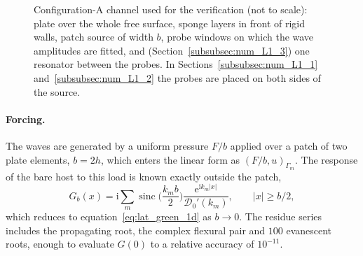 {\begin{figure}[t]
    \centering
    \caption{Configuration-A channel used for the verification (not to scale): plate over the whole free surface, sponge layers in front of rigid walls, patch source of width $b$, probe windows on which the wave amplitudes are fitted, and (Section~\ref{subsubsec:num_L1_3}) one resonator between the probes. In Sections~\ref{subsubsec:num_L1_1} and~\ref{subsubsec:num_L1_2} the probes are placed on both sides of the source.}
    \label{fig:num_channel_A}
\end{figure}

\paragraph{Forcing.} The waves are generated by a uniform pressure $F/b$ applied over a patch of two plate elements, $b=2h$, which enters the linear form as $(F/b,u)_{\Gamma_m}$. The response of the bare host to this load is known exactly outside the patch,
\begin{equation}\label{eq:num_patch_green}
    G_b(x)=\mathrm{i}\sum_m\operatorname{sinc}\!\Big(\frac{k_mb}{2}\Big)\frac{\mathrm{e}^{\mathrm{i}k_m|x|}}{\mathcal{D}_0'(k_m)},\qquad |x|\ge b/2,
\end{equation}
which reduces to equation~\eqref{eq:lat_green_1d} as $b\to0$. The residue series includes the propagating root, the complex flexural pair and $100$ evanescent roots, enough to evaluate $G(0)$ to a relative accuracy of $10^{-11}$.

}
